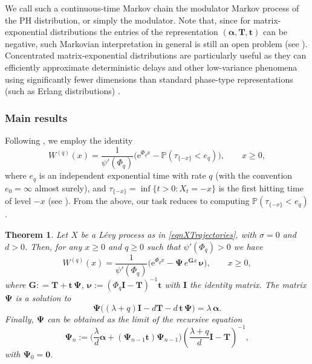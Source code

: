 \documentclass[a4paper,11pt]{article}
\newcommand{\comment}[1]{{\textcolor{red}{#1}}}
\numberwithin{equation}{section}
\theoremstyle{plain}
\newtheorem{theorem}{Theorem}[section]
\theoremstyle{definition}
\newcommand{\1}{\mathbf{1}}
\newcommand{\e}{\mathrm{e}}
\newcommand{\PP}{\mathbb{P}}
\begin{document}
We call such a continuous-time Markov chain the modulator Markov process of the PH distribution, or simply the modulator. 
Note that, since for matrix-exponential distributions the entries of the representation $(\bm \alpha,\bm T,\bm t)$ can be negative, such Markovian interpretation in general is still an open problem (see \cite{peralta2023markov}). 
Concentrated matrix-exponential distributions are particularly useful as they can efficiently approximate deterministic delays and other low-variance phenomena using significantly fewer dimensions than standard phase-type representations (such as Erlang distributions) \cite{horvath2016concentrated,horvath2020high,horvath2020numerical,meszaros2022concentrated}.

\subsubsection{Main results}

Following \cite{Ivanovs2021}, we employ the identity
\begin{equation}\label{eq:Ivanovs_identity}
W^{(q)}(x) = \frac{1}{\psi'(\Phi_q)} \Big( \e^{\Phi_q x} - \PP(\tau_{\{-x\}} < e_q) \Big), \qquad x \ge 0,
\end{equation}
where $e_q$ is an independent exponential time with rate $q$ (with the convention $e_0=\infty$ almost surely), and        
$\tau_{\{-x\}}=\inf\{t>0:X_t=-x\}$ is the first hitting time of level $-x$ (see \cite{MR2126965,MR2946445,KuznetsovKyprianouRivero2013}). From the above, our task reduces to computing $\PP(\tau_{\{-x\}} < e_q)$. 


\begin{theorem}\label{teoScaleFnBV}
Let $X$ be a L\'evy process as in \eqref{eqnXTrajectories}, with $\sigma=0$ and $d>0$. Then, for any $x\geq 0$ and $q\geq 0$ such that $\psi'(\Phi_q)>0$ we have
\begin{equation}\label{eq:scale_bv}
W^{(q)}(x) = \frac{1}{\psi'(\Phi_q)} \Big( \e^{\Phi_q x} - \bm{\Psi}\, e^{\bm{G}x}\,\bm{\nu} \Big), \qquad x \ge 0,
\end{equation}where $\bm{G}: = \bm{T} + \bm{t}\,\bm{\Psi}$, $\bm{\nu}:=(\Phi_q \bm I - \bm{T})^{-1}\bm{t}$ with $\bm I$ the identity matrix.
The matrix $\bm{\Psi}$ is a solution to 
\begin{equation}\label{eq:Psi_bv}
\bm{\Psi} \big( (\lambda + q)\bm{I} - d\bm{T} - d\,\bm{t}\,\bm{\Psi} \big) = \lambda\, \bm{\alpha}.
\end{equation}Finally, $\bm{\Psi}$ can be obtained as the limit of the recursive equation
\begin{equation}\label{eq:iteration_bv1}
\bm{\Psi}_n
:=
\Big(\frac{\lambda}{d}\bm{\alpha} + (\bm{\Psi}_{n-1}\bm{t})\bm{\Psi}_{n-1}\Big)
\left(\frac{\lambda + q}{d}\bm I - \bm{T}\right)^{-1},
\end{equation}with  $\bm{\Psi}_0=\bm{0}$.
\end{theorem}
\end{document}

